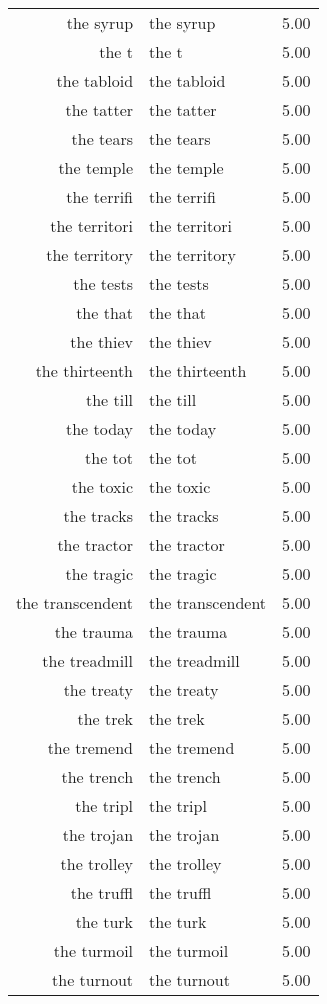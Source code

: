 \begin{table}[ht]
\begin{tabular}{rlr}
  the syrup & the syrup & 5.00 \\ 
  the t & the t & 5.00 \\ 
  the tabloid & the tabloid & 5.00 \\ 
  the tatter & the tatter & 5.00 \\ 
  the tears & the tears & 5.00 \\ 
  the temple & the temple & 5.00 \\ 
  the terrifi & the terrifi & 5.00 \\ 
  the territori & the territori & 5.00 \\ 
  the territory & the territory & 5.00 \\ 
  the tests & the tests & 5.00 \\ 
  the that & the that & 5.00 \\ 
  the thiev & the thiev & 5.00 \\ 
  the thirteenth & the thirteenth & 5.00 \\ 
  the till & the till & 5.00 \\ 
  the today & the today & 5.00 \\ 
  the tot & the tot & 5.00 \\ 
  the toxic & the toxic & 5.00 \\ 
  the tracks & the tracks & 5.00 \\ 
  the tractor & the tractor & 5.00 \\ 
  the tragic & the tragic & 5.00 \\ 
  the transcendent & the transcendent & 5.00 \\ 
  the trauma & the trauma & 5.00 \\ 
  the treadmill & the treadmill & 5.00 \\ 
  the treaty & the treaty & 5.00 \\ 
  the trek & the trek & 5.00 \\ 
  the tremend & the tremend & 5.00 \\ 
  the trench & the trench & 5.00 \\ 
  the tripl & the tripl & 5.00 \\ 
  the trojan & the trojan & 5.00 \\ 
  the trolley & the trolley & 5.00 \\ 
  the truffl & the truffl & 5.00 \\ 
  the turk & the turk & 5.00 \\ 
  the turmoil & the turmoil & 5.00 \\ 
  the turnout & the turnout & 5.00 \\ 

\end{tabular}
\end{table}
